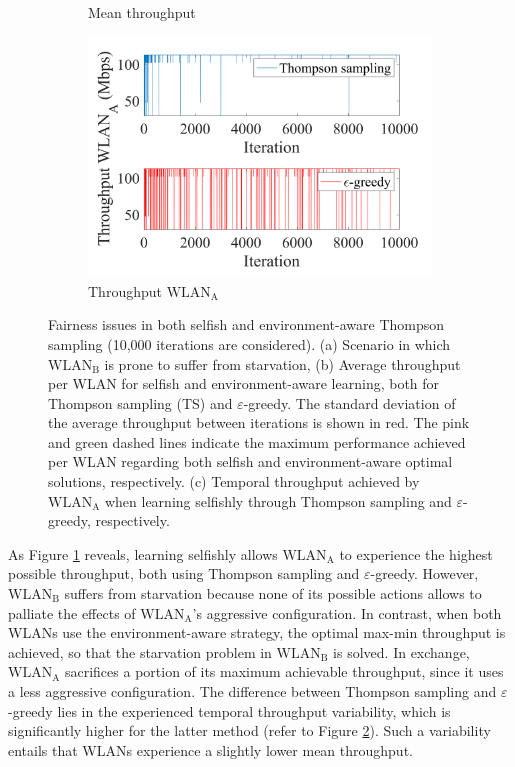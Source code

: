 \documentclass[preprint,12pt]{elsarticle}
\begin{document}
\begin{figure}[h!]
\begin{subfigure}[b]{0.36\linewidth}
		\caption{Mean throughput}\label{fig:scenario_1_new}
	\end{subfigure}
	\begin{subfigure}[b]{0.36\textwidth}
		\includegraphics[width=\textwidth]{experiment_2_1_variability}
		\caption{Throughput $\text{WLAN}_\text{A}$}
		\label{fig:experiment_2_1_variability}
	\end{subfigure}
	\caption{Fairness issues in both selfish and environment-aware Thompson sampling (10,000 iterations are considered). (a) Scenario in which $\text{WLAN}_\text{B}$ is prone to suffer from starvation, (b) Average throughput per WLAN for selfish and environment-aware learning, both for Thompson sampling (TS) and $\varepsilon$-greedy. The standard deviation of the average throughput between iterations is shown in red. The pink and green dashed lines indicate the maximum performance achieved per WLAN regarding both selfish and environment-aware optimal solutions, respectively. (c) Temporal throughput achieved by $\text{WLAN}_\text{A}$ when learning selfishly through Thompson sampling and $\varepsilon$-greedy, respectively.}
	\label{fig:selfish_learning_fairness_issue}
\end{figure}   	

As Figure \ref{fig:scenario_1_new} reveals, learning selfishly allows $\text{WLAN}_\text{A}$ to experience the highest possible throughput, both using Thompson sampling and $\varepsilon$-greedy. However, $\text{WLAN}_\text{B}$ suffers from starvation because none of its possible actions allows to palliate the effects of $\text{WLAN}_\text{A}$'s aggressive configuration. In contrast, when both WLANs use the environment-aware strategy, the optimal max-min throughput is achieved, so that the starvation problem in $\text{WLAN}_\text{B}$ is solved. In exchange, $\text{WLAN}_\text{A}$ sacrifices a portion of its maximum achievable throughput, since it uses a less aggressive configuration. The difference between Thompson sampling and $\varepsilon$-greedy lies in the experienced temporal throughput variability, which is significantly higher for the latter method (refer to Figure \ref{fig:experiment_2_1_variability}). Such a variability entails that WLANs experience a slightly lower mean throughput.
\end{document}
